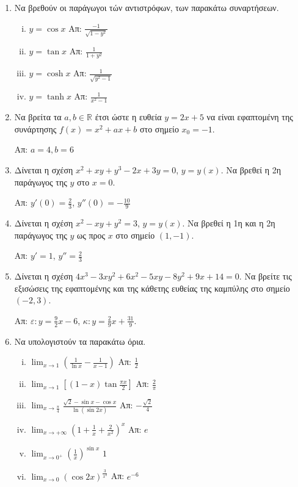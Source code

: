 \begin{enumerate}
	\item Να βρεθούν οι παράγωγοι τών αντιστρόφων, των παρακάτω συναρτήσεων.
		\begin{enumerate}[(i)]
			\item $ y = \cos{x} $ \hfill Απ: $ \frac{-1}{\sqrt{1 - y^{2}}} $
			\item $ y = \tan{x} $ \hfill Απ: $ \frac{1}{1 + y^{2}} $
			\item $ y = \cosh{x} $  \hfill Απ: $ \frac{1}{\sqrt{y^{2} - 1}} $
			\item $ y = \tanh{x} $ \hfill Απ: $ \frac{1}{x^{2} - 1} $
		\end{enumerate}


	\item Να βρείτα τα $ a, b \in \mathbb{R} $ έτσι ώστε η ευθεία $ y = 2x + 5
		$ να είναι εφαπτομένη της συνάρτησης $ f(x) = x^{2} + ax + b $ στο
		σημείο $ x_{0} = -1 $. 

		\hfill Απ: $ a = 4, b = 6 $

	\item Δίνεται η σχέση $ x^{2} + xy + y^{3} -2x + 3y = 0 $, $ y=y(x) $. Να βρεθεί η
		2η παράγωγος της $y$ στο $ x=0 $. 
		
		\hfill Απ: $ y'(0) = \frac{2}{3} $, $ y''(0) = -\frac{10}{9} $ 

	\item Δίνεται η σχέση $ x^{2} - xy + y^{2} = 3 $, $ y=y(x) $. Να βρεθεί η 1η
		και η 2η παράγωγος της $y$ ως προς $x$ στο σημείο $ (1,-1) $.

		\hfill Απ: $ y' = 1$, $ y'' = \frac{2}{3} $

	\item Δίνεται η σχέση $ 4x^{3} - 3xy^{2} + 6x^{2} - 5xy - 8 y^{2} + 9x + 14
		= 0$. Να βρείτε τις εξισώσεις της εφαπτομένης και της κάθετης ευθείας
		της καμπύλης στο σημείο $ (-2,3) $.

		\hfill Απ: $\varepsilon\colon y = \frac{9}{2} x - 6 $, $\kappa\colon y = \frac{2}{9} x +
		\frac{31}{9} $.


	\item Να υπολογιστούν τα παρακάτω όρια.
		\begin{enumerate}[(i)]
			\item $ \lim_{x\to 1} \left(\frac{1}{\ln{x}} - \frac{1}{x-1}\right) $ \hfill
				Απ: $ \frac{1}{2} $
			\item $ \lim_{x\to 1} \left[(1-x) \tan{\frac{\pi x}{2}}\right] $ \hfill Απ: $
				\frac{2}{\pi} $
			\item $ \lim_{x\to \frac{\pi}{4}} \frac{\sqrt{2} - \sin{x} -
				\cos{x}}{\ln{(\sin{2x})}} $ \hfill Απ: $ - \frac{\sqrt{2}}{4} $
			\item $ \lim_{x\to +\infty} \left(1 + \frac{1}{x} +
				\frac{2}{x^{2}}\right)^{x} $ \hfill Απ: $ e $ 
			\item $ \lim_{x\to 0^{+}} \left(\frac{1}{x}\right)^{\sin{x}} $ \hfill $ 1 $
			\item $ \lim_{x\to 0} \left(\cos{2x}\right)^{\frac{3}{x^{2}}}  $ \hfill Απ:
				$ e^{-6} $
		\end{enumerate}



\end{enumerate}

